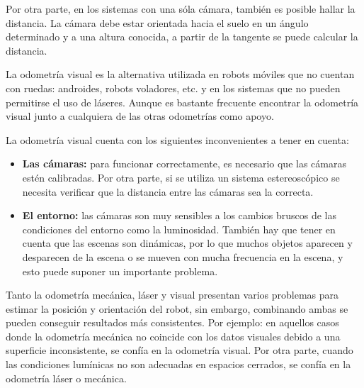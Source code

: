 Por otra parte, en los sistemas con una sóla cámara, también es posible hallar
la distancia. La cámara debe estar orientada hacia el suelo en un ángulo
determinado y a una altura conocida, a partir de la tangente se puede calcular
la distancia.

La odometría visual es la alternativa utilizada en robots móviles que no cuentan
con ruedas: androides, robots voladores, etc. y en los sistemas que no pueden
permitirse el uso de láseres. Aunque es bastante frecuente encontrar la
odometría visual junto a cualquiera de las otras odometrías como apoyo.

La odometría visual cuenta con los siguientes inconvenientes a tener en cuenta:

\begin{itemize}
  \item \textbf{Las cámaras:} para funcionar correctamente, es necesario que las
  cámaras estén calibradas. Por otra parte, si se utiliza un sistema
  estereoscópico se necesita verificar que la distancia entre las cámaras sea la
  correcta.
  \item \textbf{El entorno:} las cámaras son muy sensibles a los cambios bruscos
  de las condiciones del entorno como la luminosidad. También hay que tener en
  cuenta que las escenas son dinámicas, por lo que muchos objetos aparecen y
  desparecen de la escena o se mueven con mucha frecuencia en la escena, y esto
  puede suponer un importante problema.
\end{itemize}
    
Tanto la odometría mecánica, láser y visual presentan varios problemas para
estimar la posición y orientación del robot, sin embargo, combinando ambas se
pueden conseguir resultados más consistentes. Por ejemplo: en aquellos casos
donde la odometría mecánica no coincide con los datos visuales debido a una
superficie inconsistente, se confía en la odometría visual. Por otra parte,
cuando las condiciones lumínicas no son adecuadas en espacios cerrados, se
confía en la odometría láser o mecánica.

